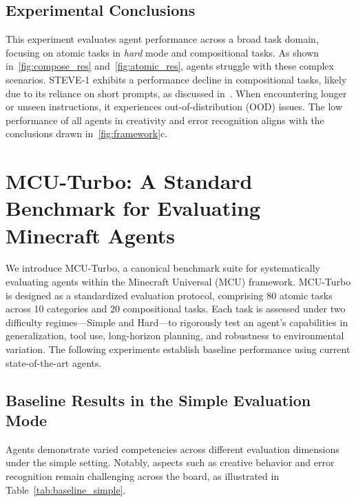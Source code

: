 \subsection{Experimental Conclusions}
This experiment evaluates agent performance across a broad task domain, focusing on atomic tasks in \emph{hard} mode and compositional tasks. As shown in~\cref{fig:compose_res} and~\cref{fig:atomic_res}, agents struggle with these complex scenarios. STEVE-1 exhibits a performance decline in compositional tasks, likely due to its reliance on short prompts, as discussed in~\citet{steve1}. When encountering longer or unseen instructions, it experiences out-of-distribution (OOD) issues. The low performance of all agents in creativity and error recognition aligns with the conclusions drawn in~\cref{fig:framework}c.




\newpage

\section{MCU-Turbo: A Standard Benchmark for Evaluating Minecraft Agents}
\label{app.mcu-turbo}
We introduce MCU-Turbo, a canonical benchmark suite for systematically evaluating agents within the Minecraft Universal (MCU) framework. MCU-Turbo is designed as a standardized evaluation protocol, comprising 80 atomic tasks across 10 categories and 20 compositional tasks. Each task is assessed under two difficulty regimes—Simple and Hard—to rigorously test an agent’s capabilities in generalization, tool use, long-horizon planning, and robustness to environmental variation. The following experiments establish baseline performance using current state-of-the-art agents.

\subsection{Baseline Results in the Simple Evaluation Mode}
Agents demonstrate varied competencies across different evaluation dimensions under the simple setting. Notably, aspects such as creative behavior and error recognition remain challenging across the board, as illustrated in Table~\ref{tab:baseline_simple}.

\begin{table}[ht]
\centering
\caption{Baseline agent performance in simple mode.}
\label{tab:baseline_simple}
\end{table}

